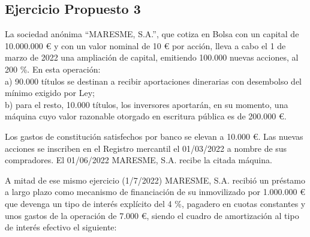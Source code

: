 \hypertarget{ejercicio-propuesto-3}{%
\subsection{Ejercicio Propuesto 3}\label{ejercicio-propuesto-3}}

La sociedad anónima ``MARESME, S.A.'', que cotiza en Bolsa con un
capital de 10.000.000 € y con un valor nominal de 10 € por acción, lleva
a cabo el 1 de marzo de 2022 una ampliación de capital, emitiendo
100.000 nuevas acciones, al 200 \%. En esta operación:\\
a) 90.000 títulos se destinan a recibir aportaciones dinerarias con
desembolso del mínimo exigido por Ley;\\
b) para el resto, 10.000 títulos, los inversores aportarán, en su
momento, una máquina cuyo valor razonable otorgado en escritura pública
es de 200.000 €.

Los gastos de constitución satisfechos por banco se elevan a 10.000 €.
Las nuevas acciones se inscriben en el Registro mercantil el 01/03/2022
a nombre de sus compradores. El 01/06/2022 MARESME, S.A. recibe la
citada máquina.

A mitad de ese mismo ejercicio (1/7/2022) MARESME, S.A. recibió un
préstamo a largo plazo como mecanismo de financiación de su inmovilizado
por 1.000.000 € que devenga un tipo de interés explícito del 4 \%,
pagadero en cuotas constantes y unos gastos de la operación de 7.000 €,
siendo el cuadro de amortización al tipo de interés efectivo el
siguiente:

